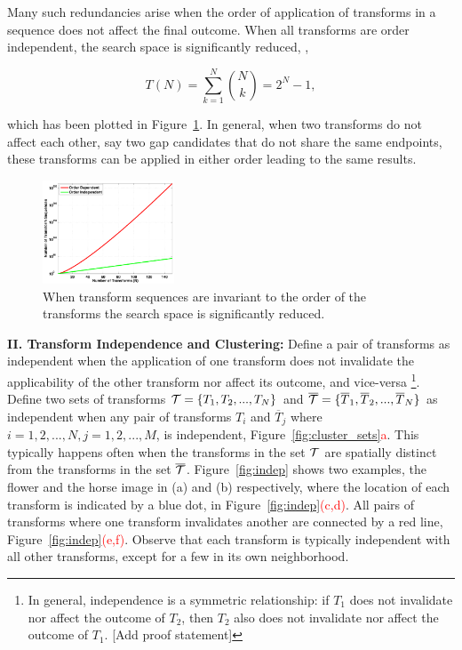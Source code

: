 Many such redundancies arise when the order of application of transforms in a sequence does not affect the final outcome. When all transforms are order independent, the search space is significantly reduced, \ie, 

\begin{equation}
T(N)=\sum_{k=1}^{N}\binom{N}{k}=2^N-1,
\label{eq:complexity2}
\end{equation}

\noindent
which has been plotted in Figure~\ref{fig:ss_growth_redun}. In general, when two transforms do not affect each other, say two gap candidates that do not share the same endpoints, these transforms can be applied in either order leading to the same results. 


\begin{figure}[ht]
\centering
\includegraphics[width=0.35\textwidth]{figs/ss_growth_redun.pdf}
\caption{When transform sequences are invariant to the order of the transforms the search space is significantly reduced.}
\label{fig:ss_growth_redun} 
\end{figure}


\noindent
{\bf II. Transform Independence and Clustering: } Define a pair of transforms as independent when the application of one transform does not invalidate the applicability of the other transform nor affect its outcome, and vice-versa  {\footnotesize\footnote{In general, independence is a symmetric relationship: if $T_1$ does not invalidate nor affect the outcome of $T_2$, then $T_2$ also does not invalidate nor affect the outcome of $T_1$. [Add proof statement] }}. Define two sets of transforms ${\cal T}=\{T_1,T_2,...,T_N\}$ and $\overline{\cal T}=\{\overline{T}_1,\overline{T}_2,...,\overline{T}_N\}$ as independent when any pair of transforms $T_i$ and $\overline{T}_j$ where $i=1,2,...,N,j=1,2,...,M$, is independent, Figure~\ref{fig:cluster_sets}\textcolor{red}{a}. This typically happens often when the transforms in the set ${\cal T}$ are spatially distinct from the transforms in the set $\overline{\cal T}$. Figure~\ref{fig:indep} shows two examples, the flower and the horse image in (a) and (b) respectively, where the location of each transform is indicated by a blue dot, in Figure~\ref{fig:indep}\textcolor{red}{(c,d)}. All pairs of transforms where one transform invalidates another are connected by a red line, Figure~\ref{fig:indep}\textcolor{red}{(e,f)}. Observe that each transform is typically independent with all other transforms, except for a few in its own neighborhood. 

